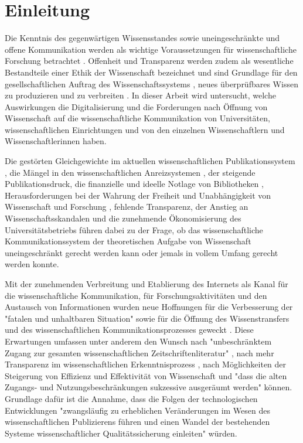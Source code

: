 \chapter{Einleitung}

Die Kenntnis des gegenwärtigen Wissensstandes sowie uneingeschränkte und offene Kommunikation werden als wichtige Voraussetzungen für wissenschaftliche Forschung betrachtet \cite{Glaeser_2006} \cite{Gibbons_1994}. Offenheit und Transparenz werden zudem als wesentliche Bestandteile einer Ethik der Wissenschaft bezeichnet \cite{Peters_2014} \cite{Resnik_2005} und sind Grundlage für den gesellschaftlichen Auftrag des Wissenschaftssystems \cite[:3]{Hanekop_2014}, neues überprüfbares Wissen zu produzieren und zu verbreiten \cite[:551]{Luescher_2014} \cite[:298]{Luhmann_1998} \cite[:100]{Graefen_2007}. In dieser Arbeit wird untersucht, welche Auswirkungen die Digitalisierung und die Forderungen nach Öffnung von Wissenschaft auf die wissenschaftliche Kommunikation von Universitäten, wissenschaftlichen Einrichtungen und von den einzelnen Wissenschaftlern und Wissenschaftlerinnen haben.

Die gestörten Gleichgewichte im aktuellen wissenschaftlichen Publikationssystem \cite{Jospeph_2006}, die Mängel in den wissenschaftlichen Anreizsystemen \cite{Osterloh_2008}, der steigende Publikationsdruck, die finanzielle und ideelle Notlage von Bibliotheken \cite{Russell_2008} \cite{Sietmann_2007}, Herausforderungen bei der Wahrung der Freiheit und Unabhängigkeit von Wissenschaft und Forschung \cite{Goetting_2015}, fehlende Transparenz, der Anstieg an Wissenschaftsskandalen \cite{Brembs_2015} und die zunehmende Ökonomisierung des Universitätsbetriebs \cite{Bauer_2006} führen dabei zu der Frage, ob das wissenschaftliche Kommunikationssystem der theoretischen Aufgabe von Wissenschaft uneingeschränkt gerecht werden kann \cite{Schekman_2013} oder jemals in vollem Umfang gerecht werden konnte.

Mit der zunehmenden Verbreitung und Etablierung des Internets als Kanal für die wissenschaftliche Kommunikation, für Forschungsaktivitäten und den Austausch von Informationen wurden neue Hoffnungen für die Verbesserung der "fatalen und unhaltbaren Situation" \cite[:155]{Brembs_2015} sowie für die Öffnung des Wissenstransfers \cite{Schulze_2013} \cite{Albert_2006} und des wissenschaftlichen Kommunikationsprozesses geweckt \cite{Hanekop_2014} \cite{European_Commission_2006} \cite{Goodrum_2001} \cite{Lawrence_1999}. Diese Erwartungen umfassen unter anderem den Wunsch nach "unbeschränktem Zugang zur gesamten wissenschaftlichen Zeitschriftenliteratur" \cite{BOAI_2002}, nach mehr Transparenz im wissenschaftlichen Erkenntnisprozess \cite{European_Commission_2015a}, nach Möglichkeiten der Steigerung von Effizienz und Effektivität von Wissenschaft \cite{Partha_1994} und "dass die alten Zugangs- und Nutzungsbeschränkungen sukzessive ausgeräumt werden" \cite{BOAI_2002} können. Grundlage dafür ist die Annahme, dass die Folgen der technologischen Entwicklungen "zwangsläufig zu erheblichen Veränderungen im Wesen des wissenschaftlichen Publizierens führen und einen Wandel der bestehenden Systeme wissenschaftlicher Qualitätssicherung einleiten" \cite{Berliner_Erklaerung_2003} würden.

